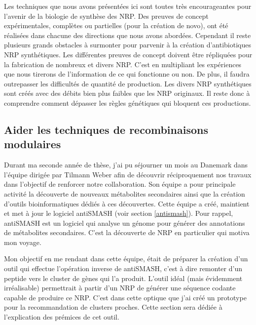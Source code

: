 Les techniques que nous avons présentées ici sont toutes très encourageantes pour l'avenir de la biologie de synthèse des NRP.
Des preuves de concept expérimentales, complètes ou partielles (pour la création de novo), ont été réalisées dans chacune des directions que nous avons abordées.
Cependant il reste plusieurs grands obstacles à surmonter pour parvenir à la création d'antibiotiques NRP synthétiques.
Les différentes preuves de concept doivent être répliquées pour la fabrication de nombreux et divers NRP.
C'est en multipliant les expériences que nous tirerons de l'information de ce qui fonctionne ou non.
De plus, il faudra outrepasser les difficultés de quantité de production.
Les divers NRP synthétiques sont créés avec des débits bien plus faibles que les NRP originaux.
Il reste donc à comprendre comment dépasser les règles génétiques qui bloquent ces productions.


\subsection{Aider les techniques de recombinaisons modulaires}

Durant ma seconde année de thèse, j'ai pu séjourner un mois au Danemark dans l'équipe dirigée par Tilmann Weber afin de découvrir réciproquement nos travaux dans l'objectif de renforcer notre collaboration.
Son équipe a pour principale activité la découverte de nouveaux métabolites secondaires ainsi que la création d'outils bioinformatiques dédiés à ces découvertes.
Cette équipe a créé, maintient et met à jour le logiciel antiSMASH (voir section \ref{antismash}).
Pour rappel, antiSMASH est un logiciel qui analyse un génome pour générer des annotations de métabolites secondaires.
C'est la découverte de NRP en particulier qui motiva mon voyage.

Mon objectif en me rendant dans cette équipe, était de préparer la création d'un outil qui effectue l'opération inverse de antiSMASH, c'est à dire remonter d'un peptide vers le cluster de gènes qui l'a produit.
L'outil idéal (mais évidemment irréalisable) permettrait à partir d'un NRP de générer une séquence codante capable de produire ce NRP.
C'est dans cette optique que j'ai créé un prototype pour la recommandation de clusters proches.
Cette section sera dédiée à l'explication des prémices de cet outil.


